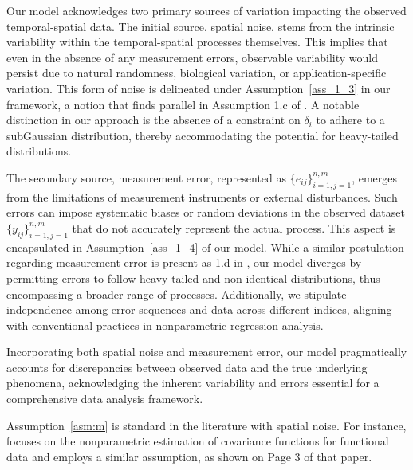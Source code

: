 \documentclass[twoside,11pt]{article}
\begin{document}
Our model acknowledges two primary sources of variation impacting the observed temporal-spatial data. The initial source, spatial noise, stems from the intrinsic variability within the temporal-spatial processes themselves. This implies that even in the absence of any measurement errors, observable variability would persist due to natural randomness, biological variation, or application-specific variation. This form of noise is delineated under Assumption~\ref{ass_1_3} in our framework, a notion that finds parallel in Assumption 1.c of \cite{padilla2023temporal}. A notable distinction in our approach is the absence of a constraint on \(\delta_i\) to adhere to a subGaussian distribution, thereby accommodating the potential for heavy-tailed distributions.

The secondary source, measurement error, represented as \(\{e_{ij}\}_{i=1,j=1}^{n,m}\), emerges from the limitations of measurement instruments or external disturbances. Such errors can impose systematic biases or random deviations in the observed dataset \(\{y_{ij}\}_{i=1,j=1}^{n,m}\) that do not accurately represent the actual process. This aspect is encapsulated in Assumption~\ref{ass_1_4} of our model. While a similar postulation regarding measurement error is present as 1.d in \cite{padilla2023temporal}, our model diverges by permitting errors to follow heavy-tailed and non-identical distributions, thus encompassing a broader range of processes. Additionally, we stipulate independence among error sequences and data across different indices, aligning with conventional practices in nonparametric regression analysis.

Incorporating both spatial noise and measurement error, our model pragmatically accounts for discrepancies between observed data and the true underlying phenomena, acknowledging the inherent variability and errors essential for a comprehensive data analysis framework.

Assumption~\ref{asm:m} is standard in the literature with spatial noise. For instance, \cite{wang2022low} focuses on the nonparametric estimation of covariance functions for functional data and employs a similar assumption, as shown on Page 3 of that paper.


\end{document}

